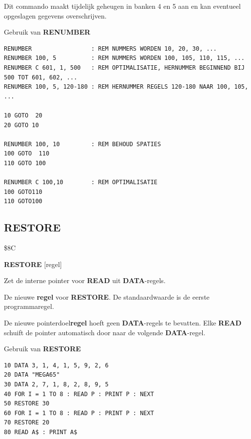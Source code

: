 \begin{description}[leftmargin=2cm,style=nextline]
                  Dit commando maakt tijdelijk geheugen in banken 4 en 5 aan en kan eventueel opgeslagen gegevens overschrijven.

\item [Voorbeelden:] Gebruik van {\bf RENUMBER}

\begin{tcolorbox}[colback=black,coltext=white]
\verbatimfont{\codefont}
\begin{verbatim}
RENUMBER                 : REM NUMMERS WORDEN 10, 20, 30, ...
RENUMBER 100, 5          : REM NUMMERS WORDEN 100, 105, 110, 115, ...
RENUMBER C 601, 1, 500   : REM OPTIMALISATIE, HERNUMMER BEGINNEND BIJ 500 TOT 601, 602, ...
RENUMBER 100, 5, 120-180 : REM HERNUMMER REGELS 120-180 NAAR 100, 105, ...

10 GOTO  20
20 GOTO 10

RENUMBER 100, 10         : REM BEHOUD SPATIES
100 GOTO  110
110 GOTO 100

RENUMBER C 100,10        : REM OPTIMALISATIE
100 GOTO110
110 GOTO100
\end{verbatim}
\end{tcolorbox}
\end{description}


\newpage
\subsection{RESTORE}
\begin{description}[leftmargin=2cm,style=nextline]
\item [Token:]    \$8C

\item [Formaat:]   {\bf RESTORE} [regel]

\item [Gebruik:]    Zet de interne pointer voor {\bf READ} uit {\bf DATA}-regels.

                  De nieuwe {\bf regel} voor {\bf RESTORE}. De standaardwaarde is de eerste programmaregel.

\item [Opmerkingen:]  De nieuwe pointerdoel{\bf regel} hoeft geen {\bf DATA}-regels te bevatten. Elke {\bf READ} schuift de pointer automatisch door naar de volgende {\bf DATA}-regel.

\item [Voorbeeld:]  Gebruik van {\bf RESTORE}

\begin{tcolorbox}[colback=black,coltext=white]
\verbatimfont{\codefont}
\begin{verbatim}
10 DATA 3, 1, 4, 1, 5, 9, 2, 6
20 DATA "MEGA65"
30 DATA 2, 7, 1, 8, 2, 8, 9, 5
40 FOR I = 1 TO 8 : READ P : PRINT P : NEXT
50 RESTORE 30
60 FOR I = 1 TO 8 : READ P : PRINT P : NEXT
70 RESTORE 20
80 READ A$ : PRINT A$
\end{verbatim}
\end{tcolorbox}
\end{description}

